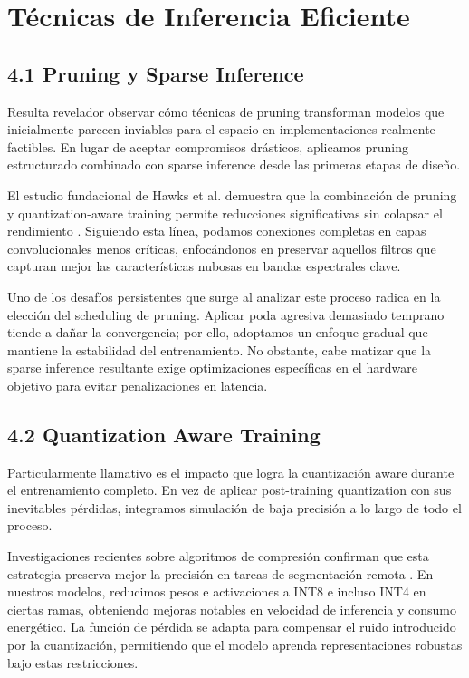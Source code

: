 \section{Técnicas de Inferencia Eficiente}

\subsection{4.1 Pruning y Sparse Inference}

Resulta revelador observar cómo técnicas de pruning transforman modelos que inicialmente parecen inviables para el espacio en implementaciones realmente factibles. En lugar de aceptar compromisos drásticos, aplicamos pruning estructurado combinado con sparse inference desde las primeras etapas de diseño. 

El estudio fundacional de Hawks et al. demuestra que la combinación de pruning y quantization-aware training permite reducciones significativas sin colapsar el rendimiento \cite{Hawks2021_QAPruning}. Siguiendo esta línea, podamos conexiones completas en capas convolucionales menos críticas, enfocándonos en preservar aquellos filtros que capturan mejor las características nubosas en bandas espectrales clave. 

Uno de los desafíos persistentes que surge al analizar este proceso radica en la elección del scheduling de pruning. Aplicar poda agresiva demasiado temprano tiende a dañar la convergencia; por ello, adoptamos un enfoque gradual que mantiene la estabilidad del entrenamiento. No obstante, cabe matizar que la sparse inference resultante exige optimizaciones específicas en el hardware objetivo para evitar penalizaciones en latencia.

\subsection{4.2 Quantization Aware Training}

Particularmente llamativo es el impacto que logra la cuantización aware durante el entrenamiento completo. En vez de aplicar post-training quantization con sus inevitables pérdidas, integramos simulación de baja precisión a lo largo de todo el proceso. 

Investigaciones recientes sobre algoritmos de compresión confirman que esta estrategia preserva mejor la precisión en tareas de segmentación remota \cite{PruningQuant2025}. En nuestros modelos, reducimos pesos e activaciones a INT8 e incluso INT4 en ciertas ramas, obteniendo mejoras notables en velocidad de inferencia y consumo energético. La función de pérdida se adapta para compensar el ruido introducido por la cuantización, permitiendo que el modelo aprenda representaciones robustas bajo estas restricciones.

